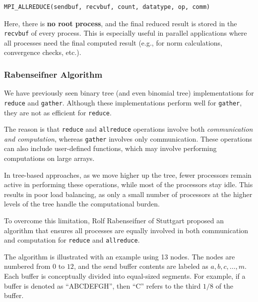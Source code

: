 \documentclass[12pt]{book}
\begin{document}
\begin{lstlisting}[style=cppstyle]
MPI_ALLREDUCE(sendbuf, recvbuf, count, datatype, op, comm)
\end{lstlisting}
Here, there is \textbf{no root process}, and the final reduced result is stored in the \texttt{recvbuf} of every process. This is especially useful in parallel applications where all processes need the final computed result (e.g., for norm calculations, convergence checks, etc.).

\subsubsection{Rabenseifner Algorithm}

We have previously seen binary tree (and even binomial tree) implementations for \texttt{reduce} 
and \texttt{gather}. Although these implementations perform well for \texttt{gather}, 
they are not as efficient for \texttt{reduce}. 

The reason is that \texttt{reduce} and \texttt{allreduce} operations involve both 
\emph{communication and computation}, whereas \texttt{gather} involves only communication. 
These operations can also include user-defined functions, which may involve performing 
computations on large arrays. 

In tree-based approaches, as we move higher up the tree, fewer processors remain 
active in performing these operations, while most of the processors stay idle. 
This results in poor load balancing, as only a small number of processors at the 
higher levels of the tree handle the computational burden.

To overcome this limitation, Rolf Rabenseifner of Stuttgart proposed an algorithm 
that ensures all processes are equally involved in both communication and computation 
for \texttt{reduce} and \texttt{allreduce}.

The algorithm is illustrated with an example using 13 nodes. 
The nodes are numbered from $0$ to $12$, and the send buffer contents 
are labeled as $a,b,c,\ldots,m$. Each buffer is conceptually divided 
into equal-sized segments. For example, if a buffer is denoted as 
``ABCDEFGH'', then ``C'' refers to the third $1/8$ of the buffer.
\end{document}
